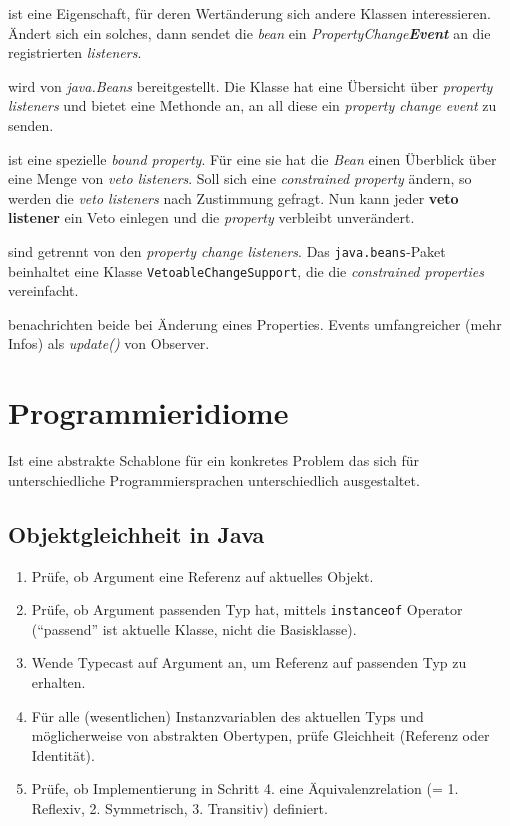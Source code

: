 \documentclass[a4paper,fontsize=9pt, DIV=calc]{scrartcl}
\begin{document}
\begin{multicols}{2}
\begin{description}[leftmargin=*]\itemsep-2mm
    \item[Bound Property] ist eine Eigenschaft, für deren Wertänderung sich andere Klassen interessieren. Ändert sich ein solches, dann sendet die \textit{bean} ein \textit{PropertyChange\textbf{Event}} an die registrierten \textit{listeners}.
		\item[PropertyChangeSupport] wird von \textit{java.Beans} bereitgestellt. Die Klasse hat eine Übersicht über \textit{property listeners} und bietet eine Methonde an, an all diese ein \textit{property change event} zu senden.
    \item[Constrained Property] ist eine spezielle \textit{bound property}. Für eine sie hat die \textit{Bean} einen Überblick über eine Menge von \textit{veto listeners}. Soll sich eine \textit{constrained property} ändern, so werden die \textit{veto listeners} nach Zustimmung gefragt. Nun kann jeder \textbf{veto listener} ein Veto einlegen und die \textit{property} verbleibt unverändert.
    \item[Veto Listeners] sind getrennt von den \textit{property change listeners}. Das \texttt{java.beans}-Paket beinhaltet eine Klasse \texttt{VetoableChangeSupport}, die die \textit{constrained properties} vereinfacht.
		\item[Vergleich mit Observer] benachrichten beide bei Änderung eines Properties. Events umfangreicher (mehr Infos) als \textit{update()} von Observer.
\end{description}


\section{Programmieridiome}
Ist eine abstrakte Schablone für ein konkretes Problem das sich für unterschiedliche Programmiersprachen unterschiedlich ausgestaltet.
\subsection{Objektgleichheit in Java}

\begin{enumerate}[leftmargin=*]\itemsep-2mm
    \item Prüfe, ob Argument eine Referenz auf aktuelles Objekt.
    \item Prüfe, ob Argument passenden Typ hat, mittels \texttt{instanceof} Operator ("`passend"' ist aktuelle Klasse, nicht die Basisklasse).
    \item Wende Typecast auf Argument an, um Referenz auf passenden Typ zu erhalten.
    \item Für alle (wesentlichen) Instanzvariablen des aktuellen Typs und möglicherweise von abstrakten Obertypen, prüfe Gleichheit (Referenz oder Identität).
    \item Prüfe, ob Implementierung in Schritt 4. eine Äquivalenzrelation (= 1. Reflexiv, 2. Symmetrisch, 3. Transitiv) definiert.
\end{enumerate}


\end{multicols}
\end{document}
